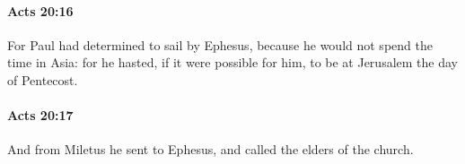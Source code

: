 		\paragraph{Acts 20:16} %
			\label{ACTS-20-16}

			For Paul had determined to sail by Ephesus, because he would not spend the time in Asia: for he hasted, if it were possible for him, to be at Jerusalem the day of Pentecost.

			\begin{framed}
			\scriptsize
				\begin{compactdesc}
					\item[SBLG] 
				\end{compactdesc}
			\end{framed}

		\paragraph{Acts 20:17} %
			\label{ACTS-20-17}

			And from Miletus he sent to Ephesus, and called the elders of the church.

